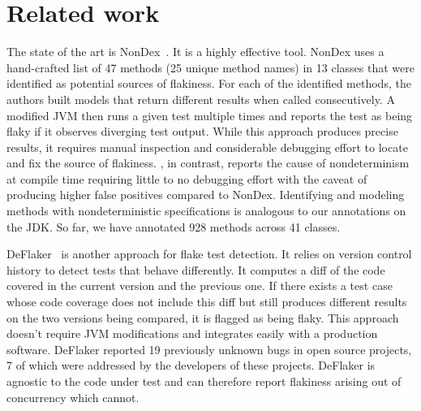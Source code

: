 \section{Related work}\label{sec:related}


The state of the art is NonDex~\cite{nondex}.  It is a highly effective tool.
NonDex uses a hand-crafted list of 47 methods (25 unique method names)
in 13 classes that were identified as potential sources of flakiness. 
For each of the identified methods, the authors built models that
return different results when called consecutively. A modified JVM then
runs a given test multiple times and reports the test as being flaky if it observes
diverging test output. While this approach produces precise results, it requires manual inspection
and considerable debugging effort to locate and fix the source of flakiness. \TheDeterminismChecker, in
contrast, reports the cause of nondeterminism at compile time requiring little to no debugging effort with the
caveat of producing higher false positives compared to NonDex. 
Identifying and modeling methods with nondeterministic
specifications is analogous to our annotations on the JDK\@. So far, we have annotated
928 methods across 41 classes.

DeFlaker~\cite{deflaker} is another approach for flake test detection. It relies on
version control history to detect tests that behave differently. It computes a diff of the code covered
in the current version and the previous one. If there exists a test case whose code coverage does not include
this diff but still produces different results on the two versions being compared, it is flagged as being flaky.
This approach doesn't require JVM modifications
and integrates easily with a production software. DeFlaker reported 19 previously unknown bugs
in open source projects, 7 of which were addressed by the developers of these projects. DeFlaker is agnostic
to the code under test and can therefore report flakiness arising out of concurrency which \TheDeterminismChecker cannot.

